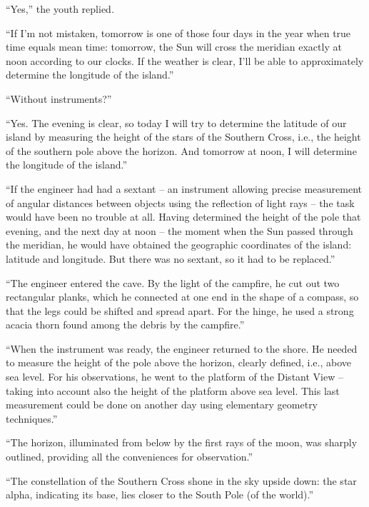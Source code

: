 ``Yes,'' the youth replied.

``If I'm not mistaken, tomorrow is one of those four days in the year when true time equals mean time: tomorrow, the Sun will cross the meridian exactly at noon according to our clocks. If the weather is clear, I'll be able to approximately determine the longitude of the island.''

``Without instruments?''

``Yes. The evening is clear, so today I will try to determine the latitude of our island by measuring the height of the stars of the Southern Cross, i.e., the height of the southern pole above the horizon. And tomorrow at noon, I will determine the longitude of the island.''

``If the engineer had had a sextant -- an instrument allowing precise measurement of angular distances between objects using the reflection of light rays -- the task would have been no trouble at all. Having determined the height of the pole that evening, and the next day at noon -- the moment when the Sun passed through the meridian, he would have obtained the geographic coordinates of the island: latitude and longitude. But there was no sextant, so it had to be replaced.''

``The engineer entered the cave. By the light of the campfire, he cut out two rectangular planks, which he connected at one end in the shape of a compass, so that the legs could be shifted and spread apart. For the hinge, he used a strong acacia thorn found among the debris by the campfire.''

``When the instrument was ready, the engineer returned to the shore. He needed to measure the height of the pole above the horizon, clearly defined, i.e., above sea level. For his observations, he went to the platform of the Distant View -- taking into account also the height of the platform above sea level. This last measurement could be done on another day using elementary geometry techniques.''

``The horizon, illuminated from below by the first rays of the moon, was sharply outlined, providing all the conveniences for observation.''

``The constellation of the Southern Cross shone in the sky upside down: the star alpha, indicating its base, lies closer to the South Pole (of the world).''

